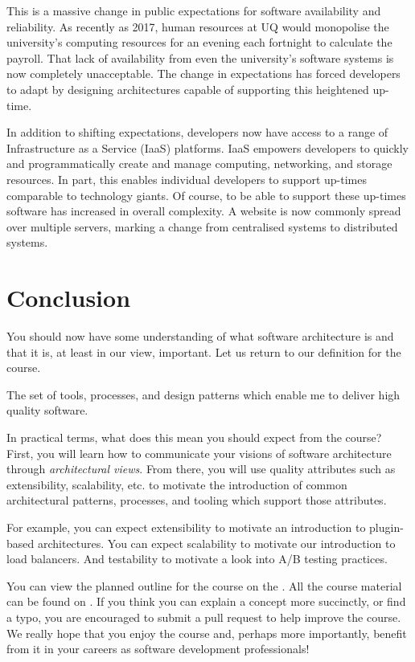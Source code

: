This is a massive change in public expectations for software availability and reliability.
As recently as 2017, human resources at UQ would monopolise the university's computing resources for an evening each fortnight to calculate the payroll.
That lack of availability from even the university's software systems is now completely unacceptable.
The change in expectations has forced developers to adapt by designing architectures capable of supporting this heightened up-time.

In addition to shifting expectations, developers now have access to a range of Infrastructure as a Service (IaaS) platforms.
IaaS empowers developers to quickly and programmatically create and manage computing, networking, and storage resources.
In part, this enables individual developers to support up-times comparable to technology giants.
Of course, to be able to support these up-times software has increased in overall complexity.
A website is now commonly spread over multiple servers, marking a change from centralised systems to distributed systems.

\section{Conclusion}

You should now have some understanding of what software architecture is and that it is, at least in our view, important.
Let us return to our definition for the course.

\begin{definition}
The set of tools, processes, and design patterns which enable me to deliver high quality software.
\end{definition}

In practical terms, what does this mean you should expect from the course?
First, you will learn how to communicate your visions of software architecture through \textsl{architectural views}.
From there, you will use quality attributes such as extensibility, scalability, etc.
to motivate the introduction of common architectural patterns, processes, and tooling which support those attributes.

For example, you can expect extensibility to motivate an introduction to plugin-based architectures.
You can expect scalability to motivate our introduction to load balancers.
And testability to motivate a look into A/B testing practices.

You can view the planned outline for the course on the .
All the course material can be found on .
If you think you can explain a concept more succinctly, or find a typo, you are encouraged to submit a pull request to help improve the course.
We really hope that you enjoy the course and, perhaps more importantly, benefit from it in your careers as software development professionals!

